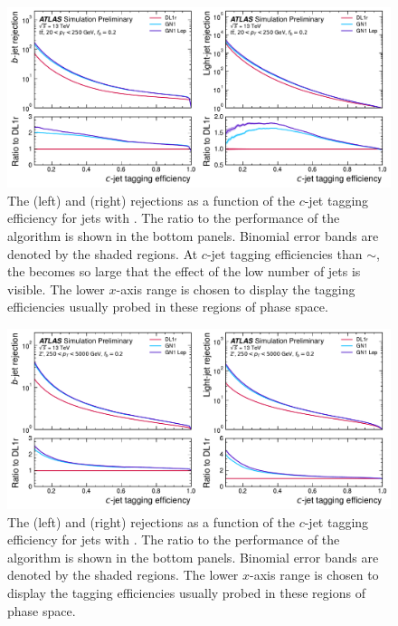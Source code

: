 \begin{figure}[!p]
    \centering
    \includegraphics[width=\textwidth]{chapters/gnn_tagger/figs/results/main/ttbar/ttbar_roc_ctag.pdf}
    \caption{The \bjet (left) and \ljet (right) rejections as a function of the $c$-jet tagging efficiency for \ttbar jets with \ttbarpt.
             The ratio to the performance of the \DLr algorithm is shown in the bottom panels.
             Binomial error bands are denoted by the shaded regions.
             At $c$-jet tagging efficiencies than $\sim$, the \lrej becomes so large that the effect of the low number of jets is visible.
             The lower $x$-axis range is chosen to display the \cjet tagging efficiencies usually probed in these regions of phase space.}
    \label{fig:ttbar_ctag_roc}
\end{figure}

\begin{figure}[!p]
   \centering
   \includegraphics[width=\textwidth]{chapters/gnn_tagger/figs/results/main/zprime/zprime_roc_ctag.pdf}
   \caption{The \bjet (left) and \ljet (right) rejections as a function of the $c$-jet tagging efficiency for \Zprime jets with \Zprimept.
            The ratio to the performance of the \DLr algorithm is shown in the bottom panels.
            Binomial error bands are denoted by the shaded regions.
            The lower $x$-axis range is chosen to display the \cjet tagging efficiencies usually probed in these regions of phase space.}
   \label{fig:zprime_ctag_roc}
\end{figure}




